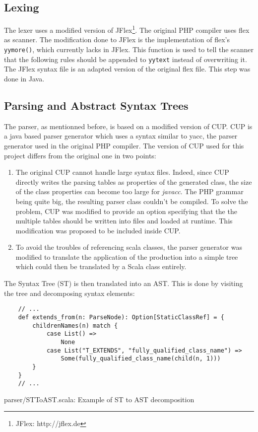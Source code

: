 \documentclass[a4paper]{article}
\begin{document}
\subsection{Lexing}
The lexer uses a modified version of JFlex\footnote{JFlex: http://jflex.de}. The
original PHP compiler uses flex as scanner. The modification done to JFlex is
the implementation of flex's \verb=yymore()=, which currently lacks in JFlex.
This function is used to tell the scanner that the following rules should be
appended to \verb=yytext= instead of overwriting it. The JFlex syntax file is an
adapted version of the original flex file. This step was done in Java.

\subsection{Parsing and Abstract Syntax Trees}
The parser, as mentionned before, is based on a modified version of CUP. CUP is
a java based parser generator which uses a syntax similar to yacc, the parser
generator used in the original PHP compiler. The version of CUP used for this
project differs from the original one in two points:
\begin{enumerate}
  \item The original CUP cannot handle large syntax files. Indeed, since CUP
    directly writes the parsing tables as properties of the generated class,
    the size of the class properties can become too large for \emph{javacc}. The
    PHP grammar being quite big, the resulting parser class couldn't be compiled.
    To solve the problem, CUP was modified to provide an option specifying that the
    the multiple tables should be written into files and loaded at runtime. This
    modification was proposed to be included inside CUP.
  \item To avoid the troubles of referencing scala classes, the parser
    generator was modified to translate the application of the production into a
    simple tree which could then be translated by a Scala class entirely.
\end{enumerate}

The Syntax Tree (ST) is then translated into an AST. This is done by visiting
the tree and decomposing syntax elements:

\begin{listing}
\begin{verbatim}
    // ...
    def extends_from(n: ParseNode): Option[StaticClassRef] = {
        childrenNames(n) match {
            case List() =>
                None
            case List("T_EXTENDS", "fully_qualified_class_name") =>
                Some(fully_qualified_class_name(child(n, 1)))
        }
    }
    // ...
\end{verbatim}
  \caption{parser/STToAST.scala: Example of ST to AST decomposition}
\end{listing}
\end{document}
